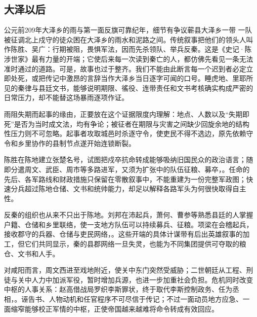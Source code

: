\subsection{大泽以后}

\begin{event}{公元前209年}{大泽乡的雨与第一面反旗}{可靠纪年，细节有争议}{蕲县大泽乡一带}
一队被征调北上戍守的徒众困在大泽乡的雨水和泥路之间。传统叙事把他们的领头人叫作陈胜、吴广：行期被阻，畏惧军法，因而先杀领队、举兵反秦。这是《史记·陈涉世家》最有力量的开端；它使后来每一次读到秦亡的人，都仿佛先看见一条无法准时通过的道路。可是，故事也过于整齐。我们不能由此断言每一个迟到者必定立即处死，或把传记中激昂的言辞当作大泽乡当日逐字可闻的口号。睡虎地、里耶所见的秦律与县廷文书，能够说明期限、徭役、连带责任和文书考核确实构成严密的日常压力，却不能替这场暴雨逐项作证。

雨阻失期而起事的缘由，正要放在这个证据限度内理解：地点、人数以及“失期即死”是否为当时成文法，均有争论；被征者在期限与灾害之间缺少回旋余地的结构性压力则不可忽略。起事者攻取城邑时杀逐守令，使吏民不得不选边，原先依赖守令和乡里协作的县制节点遂开始连锁断裂。

陈胜在陈地建立张楚名号，试图把戍卒抗命转成能够吸纳旧国民众的政治语言；随即分遣周文、武臣、周市等多路进军，又须为扩张中的队伍征粮、募卒，。任命的先后、各军路线和财政措施只保留在零散叙事中，不能重建为一份完整军政图；快速分兵超过陈地仓储、文书和统帅能力，却足以解释各路军头为何很快取得自主性。

反秦的组织也从来不只出于陈地。刘邦在沛起兵，萧何、曹参等熟悉县廷的人掌握户籍、仓储和乡里联络，使一支地方队伍可以持续募兵、征粮。项梁在会稽起兵，接收郡守的兵器、仓储与吏民网络，。这些开端的具体计谋带有后出英雄叙事的加工，但它们共同显示，秦的县郡网络一旦失灵，也能为不同集团提供可夺取的粮仓、文书和人手。

对咸阳而言，周文西进至戏地附近，使关中东门突然受威胁；二世朝廷从工程、刑徒与关中人力中加派军役，暂时增加兵源，也进一步加重社会负担。危机同时改变中枢的人事关系：赵高借战局罗织李斯罪状，终于取代李斯控制政务、任为丞相，。诬告书、人物动机和任官程序不可尽信于传记；不过一面动员地方应急、一面缩窄能够校正军情的中枢，正使帝国越来越难将命令转成有效回应。


\end{event}
